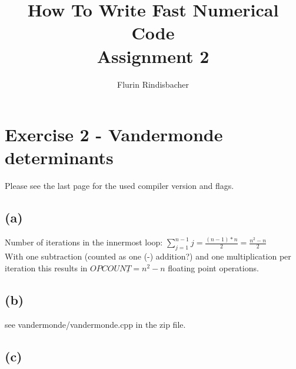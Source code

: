 \documentclass[10pt,a4paper,oneside,notitlepage]{report}
\author{Flurin Rindisbacher}
\title{How To Write Fast Numerical Code \\ \vspace{6 mm} \textbf{Assignment 2}}
\begin{document}
\maketitle

\section*{Exercise 2 - Vandermonde determinants}

Please see the last page for the used compiler version and flags.

\subsection*{(a)}
Number of iterations in the innermost loop: $\sum\limits_{j=1}^{n-1} j = \frac{(n-1)*n}{2} = \frac{n^2 -n}{2}$ \\
With one subtraction (counted as one (-) addition?) and one multiplication per iteration this results in $\underline{OPCOUNT = n^2-n}$ floating point operations.  

\subsection*{(b)}
see vandermonde/vandermonde.cpp in the zip file.

\subsection*{(c)}
\end{document}
